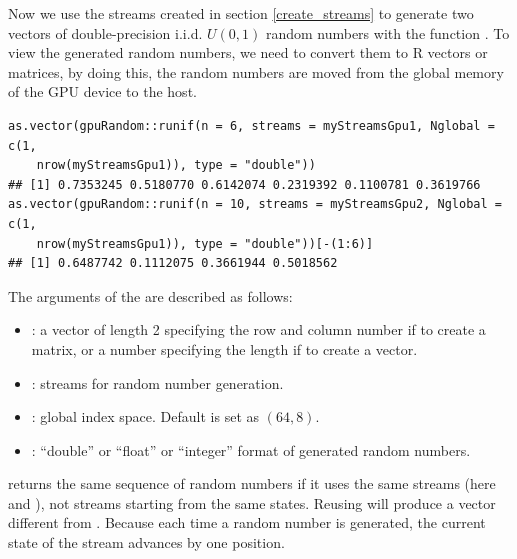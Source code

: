 \documentclass[article,nojss]{jss}\usepackage[]{graphicx}\usepackage[]{color}
\makeatletter
\newenvironment{kframe}{%
 \def\at@end@of@kframe{}%
 \ifinner\ifhmode%
  \def\at@end@of@kframe{\end{minipage}}%
  \begin{minipage}{\columnwidth}%
 \fi\fi%
 \def\FrameCommand##1{\hskip\@totalleftmargin \hskip-\fboxsep
 \colorbox{shadecolor}{##1}\hskip-\fboxsep
     \hskip-\linewidth \hskip-\@totalleftmargin \hskip\columnwidth}%
 \MakeFramed {\advance\hsize-\width
   \@totalleftmargin\z@ \linewidth\hsize
   \@setminipage}}%
 {\par\unskip\endMakeFramed%
 \at@end@of@kframe}
\newenvironment{knitrout}{}{} %
\newcommand{\fct}[1]{\code{#1()}}
\makeatother
\begin{document}
Now we use the streams created in section \ref{create_streams} to generate two vectors of double-precision i.i.d. $U(0,1)$ random numbers with the function \fct{runif}. To view the generated random numbers, we need to convert them to R vectors or matrices, by doing this, the random numbers are moved from the global memory of the GPU device to the host.
\begin{knitrout}
\color{fgcolor}\begin{kframe}
\begin{verbatim}
as.vector(gpuRandom::runif(n = 6, streams = myStreamsGpu1, Nglobal = c(1,
    nrow(myStreamsGpu1)), type = "double"))
## [1] 0.7353245 0.5180770 0.6142074 0.2319392 0.1100781 0.3619766
as.vector(gpuRandom::runif(n = 10, streams = myStreamsGpu2, Nglobal = c(1,
    nrow(myStreamsGpu1)), type = "double"))[-(1:6)]
## [1] 0.6487742 0.1112075 0.3661944 0.5018562
\end{verbatim}
\end{kframe}
\end{knitrout}
The arguments of the \fct{gpuRandom::runif} are described as follows:
\begin{itemize}
\itemsep0em 
  \item {}: a vector of length 2 specifying the row and column number if to create a matrix, or a number specifying the length if to create a vector.
  \item {}: streams for random number generation.
  \item {}: global index space. Default is set as $(64,8)$.
  \item {}: ``double'' or ``float'' or ``integer'' format of generated random numbers.
\end{itemize}
\fct{runif} returns the same sequence of random numbers if it uses the same streams (here  and ), not streams starting from the same states. Reusing  will produce a vector different from . Because each time a random number is generated, the current state of the stream advances by one position. %
\end{document}
